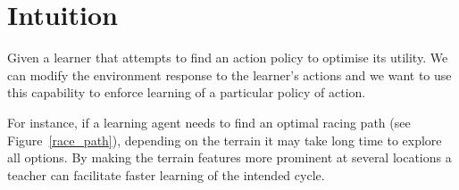 \documentclass[letterpaper]{aamas2009}
\begin{document}



\newpage
\appendix
\section{Intuition}
Given a learner that attempts to find an action policy to optimise its
utility. We can modify the environment response to the learner's
actions and we want to use this capability to enforce learning of a
particular policy of action.

For instance, if a learning agent needs to find an optimal racing path
(see Figure~\ref{race_path}), depending on the terrain it may take long
time to explore all options. By making the terrain features more
prominent at several locations a teacher can facilitate faster
learning of the intended cycle.

\begin{figure*}[ht]
{\center 
{}
\\}
\caption{\label{race_path}Unmodified (passive) and augmented environment dynamics for race path finding (colours naturally encode traversability of the cell)}
\end{figure*}
\end{document}
